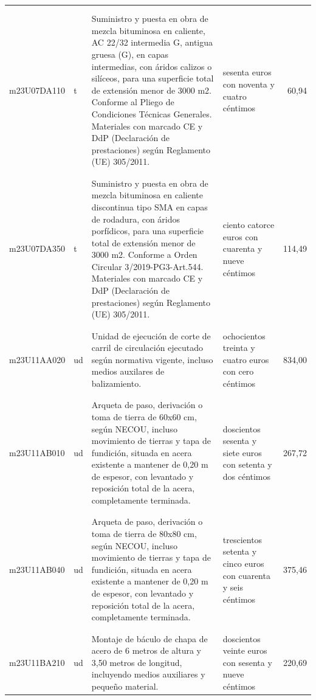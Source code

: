 \documentclass{book}%
\begin{document}
\begin{longtable}{|l|l|p{5cm}|p{3cm}|r|}
&&&&\\%
&&&&\\%
m23U07DA110&t&Suministro y puesta en obra de mezcla bituminosa en caliente, AC 22/32 intermedia G, antigua gruesa (G), en capas intermedias, con áridos calizos o silíceos, para una superficie total de extensión menor de 3000 m2. Conforme al Pliego de Condiciones Técnicas Generales. Materiales con marcado CE y DdP (Declaración de prestaciones) según Reglamento (UE) 305/2011.&sesenta euros con noventa y cuatro céntimos&60,94\\%
&&&&\\%
&&&&\\%
m23U07DA350&t&Suministro y puesta en obra de mezcla bituminosa en caliente discontinua tipo SMA en capas de rodadura, con áridos porfídicos, para una superficie total de extensión menor de 3000 m2. Conforme a Orden Circular 3/2019{-}PG3{-}Art.544. Materiales con marcado CE y DdP (Declaración de prestaciones) según Reglamento (UE) 305/2011.&ciento catorce euros con cuarenta y nueve céntimos&114,49\\%
&&&&\\%
&&&&\\%
m23U11AA020&ud&Unidad de ejecución de corte de carril de circulación ejecutado según normativa vigente, incluso medios auxilares de balizamiento.&ochocientos treinta y cuatro euros con cero céntimos&834,00\\%
&&&&\\%
&&&&\\%
m23U11AB010&ud&Arqueta de paso, derivación o toma de tierra de 60x60 cm, según NECOU, incluso movimiento de tierras y tapa de fundición, situada en acera existente a mantener de 0,20 m de espesor, con levantado y reposición total de la acera, completamente terminada.&doscientos sesenta y siete euros con setenta y dos céntimos&267,72\\%
&&&&\\%
&&&&\\%
m23U11AB040&ud&Arqueta de paso, derivación o toma de tierra de 80x80 cm, según NECOU, incluso movimiento de tierras y tapa de fundición, situada en acera existente a mantener de 0,20 m de espesor, con levantado y reposición total de la acera, completamente terminada.&trescientos setenta y cinco euros con cuarenta y seis céntimos&375,46\\%
&&&&\\%
&&&&\\%
m23U11BA210&ud&Montaje de báculo de chapa de acero de 6 metros de altura y 3,50 metros de longitud, incluyendo medios auxiliares y pequeño material.&doscientos veinte euros con sesenta y nueve céntimos&220,69\\%

\end{longtable}
\end{document}

